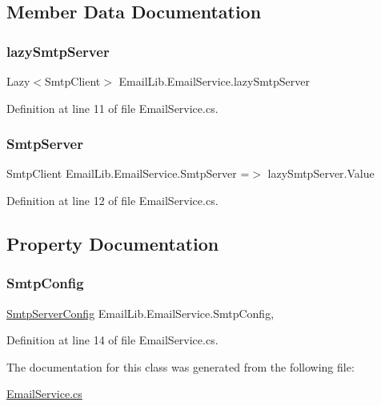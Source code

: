 \subsection{Member Data Documentation}
\mbox{\label{classEmailLib_1_1EmailService_a439ba3a6a6edaa1a9a98170538712620}} 
\subsubsection{\texorpdfstring{lazySmtpServer}{lazySmtpServer}}
{\footnotesize\ttfamily Lazy$<$Smtp\+Client$>$ Email\+Lib.\+Email\+Service.\+lazy\+Smtp\+Server\hspace{0.3cm}{\ttfamily [private]}}



Definition at line 11 of file Email\+Service.\+cs.

\mbox{\label{classEmailLib_1_1EmailService_af9376cfdd3da9365e40a48a4b2f5608e}} 
\subsubsection{\texorpdfstring{SmtpServer}{SmtpServer}}
{\footnotesize\ttfamily Smtp\+Client Email\+Lib.\+Email\+Service.\+Smtp\+Server =$>$ lazy\+Smtp\+Server.\+Value\hspace{0.3cm}{\ttfamily [private]}}



Definition at line 12 of file Email\+Service.\+cs.



\subsection{Property Documentation}
\mbox{\label{classEmailLib_1_1EmailService_ac05e7fcbe2f78c347549d5b01b233dc1}} 
\subsubsection{\texorpdfstring{SmtpConfig}{SmtpConfig}}
{\footnotesize\ttfamily \mbox{\hyperlink{classEmailLib_1_1SmtpServerConfig}{Smtp\+Server\+Config}} Email\+Lib.\+Email\+Service.\+Smtp\+Config\hspace{0.3cm}{\ttfamily [get]}, {}}



Definition at line 14 of file Email\+Service.\+cs.



The documentation for this class was generated from the following file\+:\begin{DoxyCompactItemize}
\item 
\mbox{\hyperlink{EmailService_8cs}{Email\+Service.\+cs}}\end{DoxyCompactItemize}
